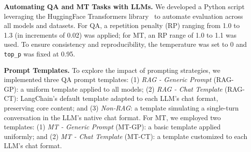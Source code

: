 \begin{table}[htbp]
\caption{Overview of Large Language Models and Their Specifications by Task}
\label{tab:ai_models}
\centering
{}
\end{table}

\textbf{Automating QA and MT Tasks with LLMs.} We developed a Python script leveraging the HuggingFace Transformers library~\cite{wolf2020transformers} to automate evaluation across all models and datasets. For QA, a repetition penalty (RP) ranging from 1.0 to 1.3 (in increments of 0.02) was applied; for MT, an RP range of 1.0 to 1.1 was used. To ensure consistency and reproducibility, the temperature was set to 0 and \texttt{top\_p} was fixed at 0.95.

\textbf{Prompt Templates.} To explore the impact of prompting strategies, we implemented three QA prompt templates: (1) \textit{RAG - Generic Prompt} (RAG-GP): a uniform template applied to all models; (2) \textit{RAG - Chat Template} (RAG-CT): LangChain's default template adapted to each LLM's chat format, preserving core content; and (3) \textit{Non-RAG}: a template simulating a single-turn conversation in the LLM's native chat format. For MT, we employed two templates: (1) \textit{MT - Generic Prompt} (MT-GP): a basic template applied uniformly; and (2) \textit{MT - Chat Template} (MT-CT): a template customized to each LLM's chat format.

